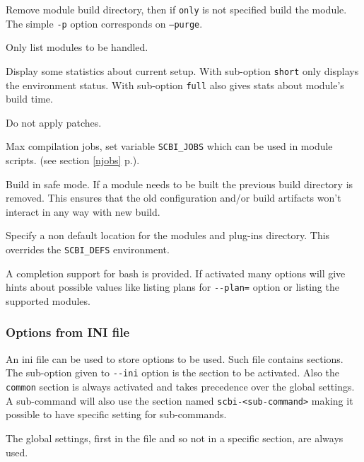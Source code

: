 \documentclass[a4paper,12pt,twoside]{article}
\newcommand{\code}[1]{\texttt{#1}}
\newcommand{\seeref}[1]{see section \ref{#1} p.\pageref{#1}}
\newcommand{\ddash}{-{}-}
\begin{document}
\begin{description}[font=\texttt]
	\item[-p | \ddash{}purge{[:only]}] Remove module build directory, then if \code{only} is not specified build the module. The simple \code{-p} option corresponds on \code{--purge}.

	\item[\ddash{}dry-run] Only list modules to be handled.

	\item[\ddash{}stat:{[}short|full{]}] Display some statistics about current setup. With sub-option \code{short} only displays the environment status. With sub-option \code{full} also gives stats about module's build time.

	\item[-n | \ddash{}no-patch] Do not apply patches.

	\item[-j | \ddash{}jobs=<n>] Max compilation jobs, set variable \code{SCBI\_JOBS} which can be used in module scripts. (\seeref{njobs}).

	\item[\ddash{}safe] Build in safe mode. If a module needs to be built the previous build directory is removed. This ensures that the old configuration and/or build artifacts won't interact in any way with new build.

	\item[\ddash{}plugins=<directory>] Specify a non default location for the modules and plug-ins directory. This overrides the \code{SCBI\_DEFS} environment.
\end{description}

A completion support for bash is provided. If activated many options will give hints about possible values like listing plans for \code{\ddash{}plan=} option or listing the supported modules.

\subsubsection{Options from INI file}
\label{inifile}

An ini file can be used to store options to be used. Such file contains sections. The sub-option given to \code{\ddash{}ini} option is the section to be activated. Also the \code{common} section is always activated and takes precedence over the global settings. A sub-command will also use the section named \code{scbi-<sub-command>} making it possible to have specific setting for sub-commands.

The global settings, first in the file and so not in a specific section, are always used.
\end{document}
